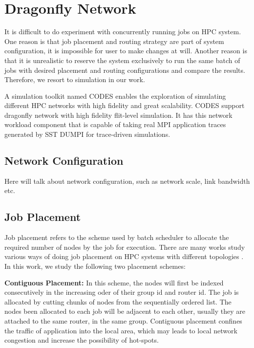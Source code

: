 \documentclass[conference,compsoc]{IEEEtran}
\begin{document}
\section{Dragonfly Network}
\label{sec:network}
It is difficult to do experiment with concurrently running jobs on HPC system. One reason is that job placement and routing strategy are part of system configuration, it is impossible for user to make changes at will. Another reason is that it is unrealistic to reserve the system exclusively to run the same batch of jobs with desired placement and routing configurations and compare the results. Therefore, we resort to simulation in our work.

A simulation toolkit named CODES enables the exploration of simulating different HPC networks with high fidelity and great scalability\cite{codes}.  CODES support dragonfly network with high fidelity flit-level simulation\cite{codes-dragonfly}. It has this network workload component that is capable of taking real MPI application traces generated by SST DUMPI\cite{sst} for trace-driven simulations.

\subsection{Network Configuration}
\label{sec: network config}
 
Here will talk about network configuration, such as network scale, link bandwidth etc.\\


\subsection{Job Placement}
\label{sec:placement-routing}

Job placement refers to the scheme used by batch scheduler to allocate the required number of nodes by the job for execution. There are many works study various ways of doing job placement on HPC systems with different topologies \cite{yang-cluster14} \cite{zhou-ipdps15} \cite{hoefler-hpdc14}. In this work, we study the following two placement schemes:

\textbf{Contiguous Placement:} In this scheme, the nodes will first be indexed consecutively in the increasing oder of their group id and router id. The job is allocated by cutting chunks of nodes from the sequentially ordered list. The nodes been allocated to each job will be adjacent to each other, usually they are attached to the same router, in the same group. Contiguous placement confines the traffic of application into the local area, which may leads to local network congestion and increase the possibility of hot-spots. 
\end{document}
